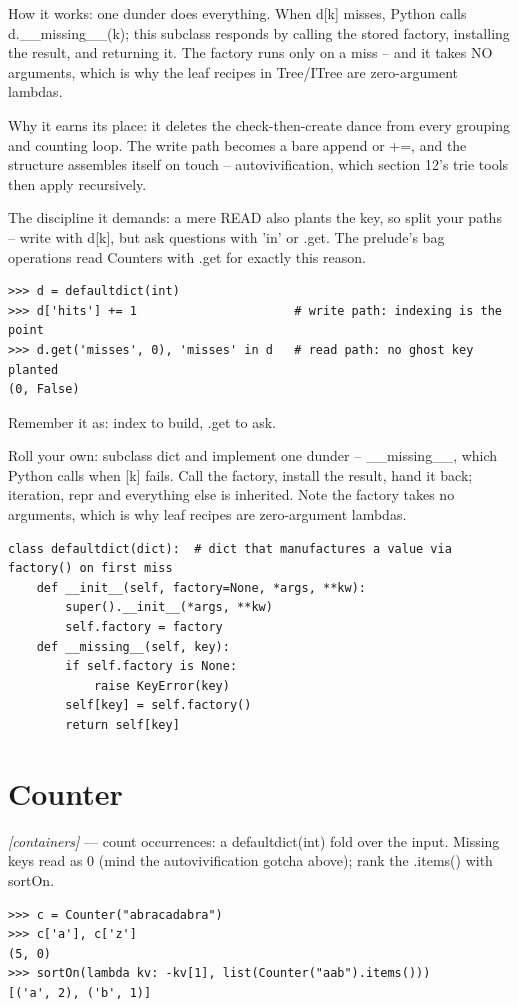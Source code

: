 \documentclass[11pt,letterpaper]{book}
\begin{document}
How it works: one dunder does everything. When d[k] misses, Python calls d.\_\_missing\_\_(k); this subclass responds by calling the stored factory, installing the result, and returning it. The factory runs only on a miss -- and it takes NO arguments, which is why the leaf recipes in Tree/ITree are zero-argument lambdas.


Why it earns its place: it deletes the check-then-create dance from every grouping and counting loop. The write path becomes a bare append or +=, and the structure assembles itself on touch -- autovivification, which section 12's trie tools then apply recursively.


The discipline it demands: a mere READ also plants the key, so split your paths -- write with d[k], but ask questions with 'in' or .get. The prelude's bag operations read Counters with .get for exactly this reason.

\begin{lstlisting}[style=spec]
>>> d = defaultdict(int)
>>> d['hits'] += 1                      # write path: indexing is the point
>>> d.get('misses', 0), 'misses' in d   # read path: no ghost key planted
(0, False)
\end{lstlisting}

Remember it as: index to build, .get to ask.


Roll your own: subclass dict and implement one dunder -- \_\_missing\_\_, which Python calls when [k] fails. Call the factory, install the result, hand it back; iteration, repr and everything else is inherited. Note the factory takes no arguments, which is why leaf recipes are zero-argument lambdas.

\begin{lstlisting}[style=code]
class defaultdict(dict):  # dict that manufactures a value via factory() on first miss
    def __init__(self, factory=None, *args, **kw):
        super().__init__(*args, **kw)
        self.factory = factory
    def __missing__(self, key):
        if self.factory is None:
            raise KeyError(key)
        self[key] = self.factory()
        return self[key]
\end{lstlisting}

\section{Counter}
\noindent\textit{[containers]} --- count occurrences: a defaultdict(int) fold over the input. Missing keys read as 0 (mind the autovivification gotcha above); rank the .items() with sortOn.
\begin{lstlisting}[style=spec]
>>> c = Counter("abracadabra")
>>> c['a'], c['z']
(5, 0)
>>> sortOn(lambda kv: -kv[1], list(Counter("aab").items()))
[('a', 2), ('b', 1)]
\end{lstlisting}
\end{document}

